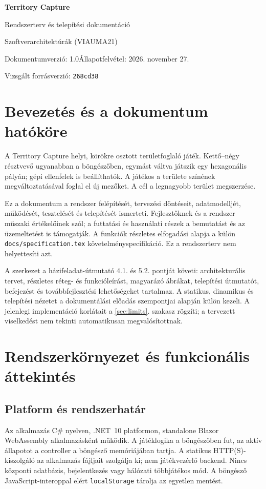 \documentclass[11pt,a4paper]{article}
\newcommand{\code}[1]{\nolinkurl{#1}}
\begin{document}
\begin{center}
{\LARGE\bfseries Territory Capture\par}
{\Large Rendszerterv és telepítési dokumentáció\par}
Szoftverarchitektúrák (VIAUMA21)\par
Dokumentumverzió: 1.0\quad Állapotfelvétel: 2026. november 27.\par
Vizsgált forrásverzió: \code{268cd38}
\end{center}
\setcounter{tocdepth}{1}
\tableofcontents
\newpage

\section{Bevezetés és a dokumentum hatóköre}
A Territory Capture helyi, körökre osztott területfoglaló játék. Kettő--négy résztvevő ugyanabban a böngészőben, egymást váltva játszik egy hexagonális pályán; gépi ellenfelek is beállíthatók. A játékos a területe színének megváltoztatásával foglal el új mezőket. A cél a legnagyobb terület megszerzése.

Ez a dokumentum a rendszer felépítését, tervezési döntéseit, adatmodelljét, működését, tesztelését és telepítését ismerteti. Fejlesztőknek és a rendszer műszaki értékelőinek szól; a futtatási és használati részek a bemutatást és az üzemeltetést is támogatják. A funkciók részletes elfogadási alapja a külön \code{docs/specification.tex} követelményspecifikáció. Ez a rendszerterv nem helyettesíti azt.

A szerkezet a házifeladat-útmutató 4.1. és 5.2. pontját követi: architekturális tervet, részletes réteg- és funkcióleírást, magyarázó ábrákat, telepítési útmutatót, befejezést és továbbfejlesztési lehetőségeket tartalmaz. A statikus, dinamikus és telepítési nézetet a dokumentálási előadás szempontjai alapján külön kezeli. A jelenlegi implementáció korlátait a \ref{sec:limits}. szakasz rögzíti; a tervezett viselkedést nem tekinti automatikusan megvalósítottnak.

\section{Rendszerkörnyezet és funkcionális áttekintés}
\subsection{Platform és rendszerhatár}
Az alkalmazás C\# nyelven, .NET~10 platformon, standalone Blazor WebAssembly alkalmazásként működik. A játéklogika a böngészőben fut, az aktív állapotot a controller a böngésző memóriájában tartja. A statikus HTTP(S)-kiszolgáló az alkalmazás fájljait szolgálja ki; nem játékvezérlő backend. Nincs központi adatbázis, bejelentkezés vagy hálózati többjátékos mód. A böngésző JavaScript-interoppal elért \code{localStorage} tárolja az egyetlen mentést.
\end{document}
